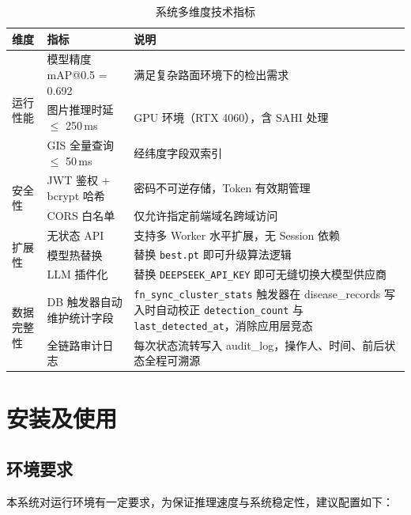 \documentclass[UTF8, a4paper, fontset=ubuntu]{ctexart}
\begin{document}
  \begin{table}[H]
  \centering
  \caption{系统多维度技术指标}
  \label{tab:kpi}
  \begin{tabular}{llp{7cm}}
  \toprule
  维度 & 指标 & 说明 \\
  \midrule
  \multirow{3}{*}{运行性能}
    & 模型精度 mAP@0.5 = 0.692 & 满足复杂路面环境下的检出需求 \\
    & 图片推理时延 $\leq$ 250\,ms & GPU 环境（RTX 4060），含 SAHI 处理 \\
    & GIS 全量查询 $\leq$ 50\,ms  & 经纬度字段双索引 \\
  \midrule
  \multirow{2}{*}{安全性}
    & JWT 鉴权 + bcrypt 哈希 & 密码不可逆存储，Token 有效期管理 \\
    & CORS 白名单 & 仅允许指定前端域名跨域访问 \\
  \midrule
  \multirow{3}{*}{扩展性}
    & 无状态 API & 支持多 Worker 水平扩展，无 Session 依赖 \\
    & 模型热替换 & 替换 \texttt{best.pt} 即可升级算法逻辑 \\
    & LLM 插件化 & 替换 \texttt{DEEPSEEK\_API\_KEY} 即可无缝切换大模型供应商 \\
  \midrule
  \multirow{2}{*}{数据完整性}
    & DB 触发器自动维护统计字段 & \texttt{fn\_sync\_cluster\_stats} 触发器在 disease\_records 写入时自动校正 \texttt{detection\_count} 与 \texttt{last\_detected\_at}，消除应用层竞态 \\
    & 全链路审计日志 & 每次状态流转写入 audit\_log，操作人、时间、前后状态全程可溯源 \\
  \bottomrule
  \end{tabular}
  \end{table}

\section{安装及使用}

\subsection{环境要求}
本系统对运行环境有一定要求，为保证推理速度与系统稳定性，建议配置如下：
\end{document}
